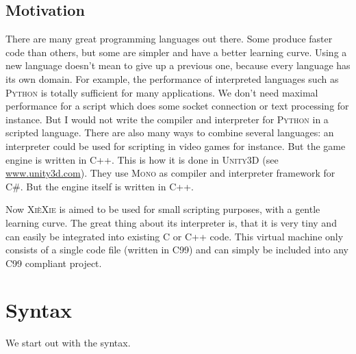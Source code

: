 \documentclass{report}
\def\xiexie{\textsc{Xi\`eXie}\xspace}
\def\cpp{\textsc{C++}\xspace}
\def\python{\textsc{Python}\xspace}
\begin{document}

\section{Motivation}

There are many great programming languages out there. Some produce faster code than others, but some
are simpler and have a better learning curve. Using a new language doesn't mean to give up a previous one,
because every language has its own domain. For example, the performance of interpreted languages such as \python
is totally sufficient for many applications. We don't need maximal performance for a script which does some
socket connection or text processing for instance.
But I would not write the compiler and interpreter for \python in a scripted language.
There are also many ways to combine several languages: an interpreter could be used for scripting in video games
for instance. But the game engine is written in \cpp.
This is how it is done in \textsc{Unity3D} (see \href{http://www.unity3d.com/}{www.unity3d.com}).
They use \textsc{Mono} as compiler and interpreter framework for \textsc{C\#}. But the engine itself is written in \cpp.

Now \xiexie is aimed to be used for small scripting purposes, with a gentle learning curve.
The great thing about its interpreter is, that it is very tiny and can easily be integrated into
existing \textsc{C} or \cpp code. This virtual machine only consists of a single code file (written in \textsc{C99})
and can simply be included into any \textsc{C99} compliant project.



\chapter{Syntax}

We start out with the syntax.


\end{document}
